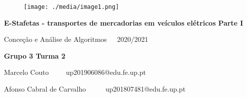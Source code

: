 \documentclass[12pt]{article}
\renewcommand{\_}{\kern-1.5pt\textunderscore\kern-1.5pt}
\begin{document}
\vspace{\baselineskip}



\begin{figure}[H]
	\begin{Center}
		\texttt{[image: ./media/image1.png]}
	\end{Center}
\end{figure}




\vspace{\baselineskip}
\vspace{\baselineskip}

\vspace{\baselineskip}

\vspace{\baselineskip}
\begin{Center}
{\fontsize{24pt}{28.8pt}\selectfont \textbf{E-Stafetas - transportes de mercadorias em veículos elétricos Parte I}}
\end{Center}
\begin{Center}
{\fontsize{20pt}{24.0pt}\selectfont Conceção e Análise de Algoritmos\ \ \   2020/2021}
\end{Center}

\vspace{\baselineskip}

\vspace{\baselineskip}

\vspace{\baselineskip}

\vspace{\baselineskip}

\vspace{\baselineskip}
\begin{adjustwidth}{0.25in}{0.0in}
\begin{Center}
{\fontsize{16pt}{19.2pt}\selectfont \textbf{Grupo 3 Turma 2}}
\end{Center}
\end{adjustwidth}

\begin{adjustwidth}{0.25in}{0.0in}
{\fontsize{15pt}{18.0pt}\selectfont Marcelo Couto\tab \tab \tab \ \ \ \ \  up201906086@edu.fe.up.pt}
\end{adjustwidth}

\begin{adjustwidth}{0.25in}{-0.0in}
{\fontsize{15pt}{18.0pt}\selectfont Afonso Cabral de Carvalho \tab \ \ \ \ \  up201807481@edu.fe.up.pt}
\end{adjustwidth}
\end{document}
